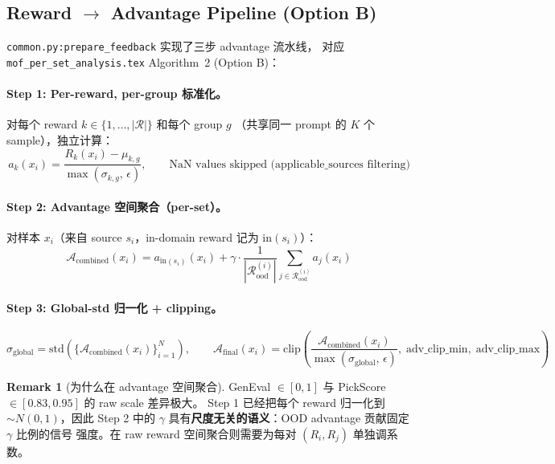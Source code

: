 \documentclass[11pt,a4paper]{article}
\newcommand{\adv}{\mathcal{A}}
\theoremstyle{definition}
\newtheorem{remark}{Remark}
\begin{document}
\subsection{Reward $\to$ Advantage Pipeline (Option B)}
\label{subsec:advantage_pipeline}

\texttt{common.py:prepare\_feedback} 实现了三步 advantage 流水线，
对应 \texttt{mof\_per\_set\_analysis.tex} Algorithm~2 (Option B)：

\paragraph{Step 1: Per-reward, per-group 标准化。}
对每个 reward $k \in \{1, \ldots, |\mathcal{R}|\}$ 和每个 group $g$
（共享同一 prompt 的 $K$ 个 sample），独立计算：
\begin{equation}
a_k(x_i) = \frac{R_k(x_i) - \mu_{k,g}}{\max(\sigma_{k,g},\,\epsilon)},
\qquad \text{NaN values skipped (applicable\_sources filtering)}
\label{eq:step1}
\end{equation}

\paragraph{Step 2: Advantage 空间聚合（per-set）。}
对样本 $x_i$（来自 source $s_i$，in-domain reward 记为 $\mathrm{in}(s_i)$）：
\begin{equation}
\adv_{\text{combined}}(x_i)
= a_{\mathrm{in}(s_i)}(x_i)
+ \gamma \cdot \frac{1}{|\mathcal{R}_{\mathrm{ood}}^{(i)}|}
  \sum_{j \in \mathcal{R}_{\mathrm{ood}}^{(i)}} a_j(x_i)
\label{eq:step2}
\end{equation}

\paragraph{Step 3: Global-std 归一化 + clipping。}
\begin{equation}
\sigma_{\text{global}} = \mathrm{std}\!\left(\{\adv_{\text{combined}}(x_i)\}_{i=1}^N\right),
\qquad
\adv_{\text{final}}(x_i)
= \mathrm{clip}\!\left(
\frac{\adv_{\text{combined}}(x_i)}{\max(\sigma_{\text{global}},\,\epsilon)},
\;\text{adv\_clip\_min},\;\text{adv\_clip\_max}
\right)
\label{eq:step3}
\end{equation}

\begin{remark}[为什么在 advantage 空间聚合]
GenEval $\in [0,1]$ 与 PickScore $\in [0.83, 0.95]$ 的 raw scale 差异极大。
Step 1 已经把每个 reward 归一化到 $\sim N(0, 1)$，因此 Step 2 中的 $\gamma$
具有\textbf{尺度无关的语义}：OOD advantage 贡献固定 $\gamma$ 比例的信号
强度。在 raw reward 空间聚合则需要为每对 $(R_i, R_j)$ 单独调系数。
\end{remark}
\end{document}
